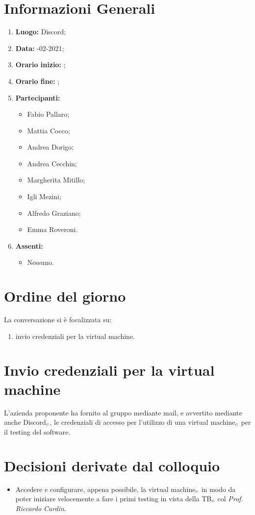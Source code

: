 \newpage
\section{Informazioni Generali}
\begin{enumerate}
	\item \textbf{Luogo:} \normalfont Discord;
	\item \textbf{Data:} -02-2021;
	\item \textbf{Orario inizio:} ;
	\item \textbf{Orario fine:} ;
	\item \textbf{Partecipanti:}
	\begin{itemize}
		\item Fabio Pallaro;
		\item Mattia Cocco;
		\item Andrea Dorigo;
		\item Andrea Cecchin;
		\item Margherita Mitillo;
		\item Igli Mezini;
		\item Alfredo Graziano;
		\item Emma Roveroni.
	\end{itemize}
	\item \textbf{Assenti:}
	\begin{itemize}
		\item Nessuno.
	\end{itemize}
\end{enumerate}
\section{Ordine del giorno}
La conversazione si è focalizzata su:
\begin{enumerate}
	\item invio credenziali per la virtual machine.
\end{enumerate}

\section{Invio credenziali per la virtual machine}
L'azienda proponente ha fornito al gruppo mediante mail, e avvertito mediante anche Discord$_{\scaleto{G}{3pt}}$, le credenziali di accesso per l'utilizzo di una virtual machine$_{\scaleto{G}{3pt}}$ per il testing del software.

\section{Decisioni derivate dal colloquio}
\begin{itemize}
	\item Accedere e configurare, appena possibile, la virtual machine$_{\scaleto{G}{3pt}}$ in modo da poter iniziare velocemente a fare i primi testing in vista della TB$_{\scaleto{G}{3pt}}$ col \textit{Prof. Riccardo Cardin}.
\end{itemize}
